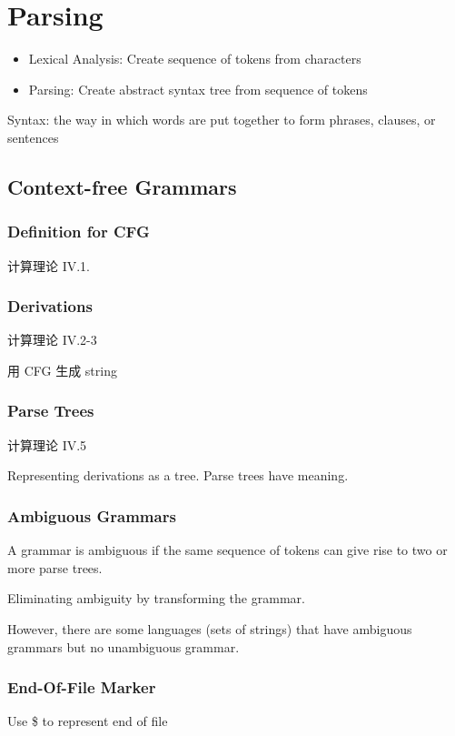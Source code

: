 \newpage
\section{Parsing}
\begin{itemize}
    \item Lexical Analysis: Create sequence of tokens from characters
    \item Parsing: Create abstract syntax tree from sequence of tokens
\end{itemize}

Syntax: the way in which words are put together to form phrases, clauses, or sentences

\subsection{Context-free Grammars}
\subsubsection{Definition for CFG}
计算理论 IV.1.

\subsubsection{Derivations}
计算理论 IV.2-3

用 CFG 生成 string

\subsubsection{Parse Trees}
计算理论 IV.5

Representing derivations as a tree. Parse trees have meaning. 

\subsubsection{Ambiguous Grammars}
A grammar is ambiguous if the same sequence of tokens can give rise to two or more parse trees.

Eliminating ambiguity by transforming the grammar.

However, there are some languages (sets of strings) that have ambiguous grammars but no unambiguous grammar.

\subsubsection{End-Of-File Marker}
Use \$ to represent end of file